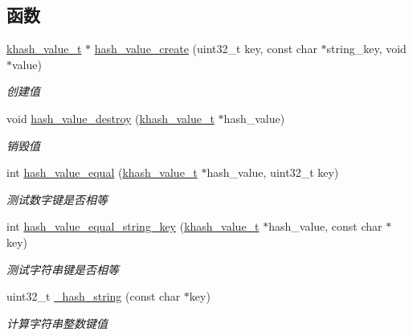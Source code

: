 \subsection*{函数}
\begin{DoxyCompactItemize}
\item 
\hyperlink{a00056_aa13ac88a5567525fe44f3670134c3d96_aa13ac88a5567525fe44f3670134c3d96}{khash\+\_\+value\+\_\+t} $\ast$ \hyperlink{a00067_aa5ef4de9803e44078b9bda01aab51065_aa5ef4de9803e44078b9bda01aab51065}{hash\+\_\+value\+\_\+create} (uint32\+\_\+t key, const char $\ast$string\+\_\+key, void $\ast$value)
\begin{DoxyCompactList}\small\item\em 创建值 \end{DoxyCompactList}\item 
void \hyperlink{a00067_a802913eb2b0816f5c3c9d26a991f861d_a802913eb2b0816f5c3c9d26a991f861d}{hash\+\_\+value\+\_\+destroy} (\hyperlink{a00056_aa13ac88a5567525fe44f3670134c3d96_aa13ac88a5567525fe44f3670134c3d96}{khash\+\_\+value\+\_\+t} $\ast$hash\+\_\+value)
\begin{DoxyCompactList}\small\item\em 销毁值 \end{DoxyCompactList}\item 
int \hyperlink{a00067_a0ec14665ff21b19523785b967f48ec10_a0ec14665ff21b19523785b967f48ec10}{hash\+\_\+value\+\_\+equal} (\hyperlink{a00056_aa13ac88a5567525fe44f3670134c3d96_aa13ac88a5567525fe44f3670134c3d96}{khash\+\_\+value\+\_\+t} $\ast$hash\+\_\+value, uint32\+\_\+t key)
\begin{DoxyCompactList}\small\item\em 测试数字键是否相等 \end{DoxyCompactList}\item 
int \hyperlink{a00067_a75b92bdd0e76be083813e5e01ce47aa4_a75b92bdd0e76be083813e5e01ce47aa4}{hash\+\_\+value\+\_\+equal\+\_\+string\+\_\+key} (\hyperlink{a00056_aa13ac88a5567525fe44f3670134c3d96_aa13ac88a5567525fe44f3670134c3d96}{khash\+\_\+value\+\_\+t} $\ast$hash\+\_\+value, const char $\ast$key)
\begin{DoxyCompactList}\small\item\em 测试字符串键是否相等 \end{DoxyCompactList}\item 
uint32\+\_\+t \hyperlink{a00067_abf1a155690ff024f3e8a82878ac4b887_abf1a155690ff024f3e8a82878ac4b887}{\+\_\+hash\+\_\+string} (const char $\ast$key)
\begin{DoxyCompactList}\small\item\em 计算字符串整数键值 \end{DoxyCompactList}\item 

\end{DoxyCompactItemize}
